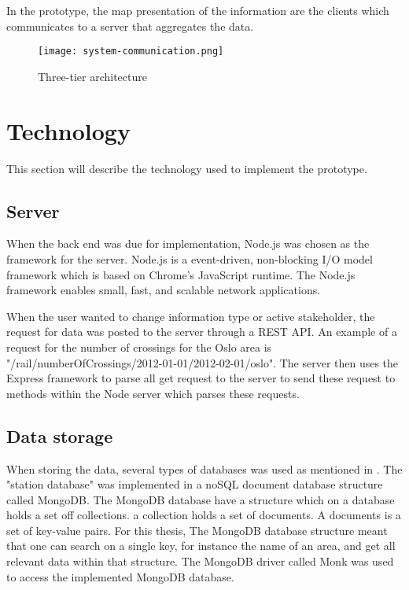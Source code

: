 In the prototype, the map presentation of the information are the clients which
communicates to a server that aggregates the data.


\cite[pp. 235-237]{Bass:2012:SAP:2392670}	%
\cite[pp. 217-219]{Bass:2012:SAP:2392670}	%


\begin{figure}[!htbp]
	\texttt{[image: system-communication.png]}
	\caption[Three-tier architecture]{Three-tier architecture}
	\label{fig:three-tier_architecture}
\end{figure}

\section{Technology} %
This section will describe the technology used to implement the prototype.
\label{sec:technology}

\subsection{Server} %
\label{sub:server}
When the back end was due for implementation, Node.js\cite{nodeJs} was chosen 
as the framework for the server. Node.js is a event-driven, non-blocking  I/O
model framework which is based on Chrome's\cite{chromeJavaScriptEngine} 
JavaScript runtime. The Node.js framework enables small, fast, and scalable 
network applications.

When the user wanted to change information type or active stakeholder, the
request for data was posted to the server through a REST\cite{REST} API. An
example of a request for the number of crossings for the Oslo area is
"/rail/numberOfCrossings/2012-01-01/2012-02-01/oslo". The server then uses the
Express\cite{express} framework to parse all get request to the server to send
these request to methods within the Node server which parses these requests.



\subsection{Data storage} %
\label{sub:technology_data_storage}
When storing the data, several types of databases was used as mentioned in
. The "station database" was implemented in
a noSQL document database structure called MongoDB\cite{mongoDB}. The MongoDB
database have a structure which on a database holds a set off collections. a
collection holds a set of documents. A documents is a set of key-value pairs.
For this thesis, The MongoDB database structure meant that one can search 
on a single key, for instance the name of an area, and get all relevant data 
within that structure. The MongoDB driver called Monk\cite{npmMonk} was used 
to access the implemented MongoDB database.\\

